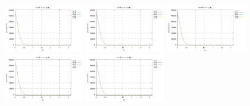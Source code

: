 \noindent
\includegraphics[width=3.5cm]{python_codes/fieldstone_152/RESULTS/exp2/qqq_16_m2}
\includegraphics[width=3.5cm]{python_codes/fieldstone_152/RESULTS/exp2/qqq_16_m3}
\includegraphics[width=3.5cm]{python_codes/fieldstone_152/RESULTS/exp2/qqq_16_m4}
\includegraphics[width=3.5cm]{python_codes/fieldstone_152/RESULTS/exp2/qqq_16_m5}
\includegraphics[width=3.5cm]{python_codes/fieldstone_152/RESULTS/exp2/qqq_16_m6}

